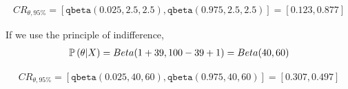 \documentclass[12pt]{article}
\begin{document}
\begin{enumerate}
\begin{align*}
    CR_{\theta, 95\%} = [\texttt{qbeta}(0.025, 2.5, 2.5), \texttt{qbeta}(0.975, 2.5, 2.5)] = [0.123, 0.877]
\end{align*}



If we use the principle of indifference, 
\begin{align*}
    \mathbb{P}\left(\theta | X\right) = Beta(1  +39, 100 - 39 + 1) = Beta(40 , 60) 
\end{align*}

\begin{align*}
    CR_{\theta, 95\%} = [\texttt{qbeta}(0.025, 40, 60), \texttt{qbeta}(0.975, 40, 60)] = [0.307, 0.497]
\end{align*}

\end{enumerate}
\end{document}
